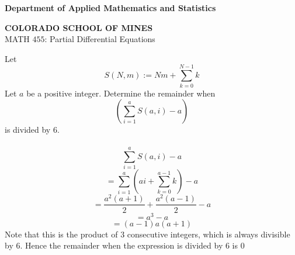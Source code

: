 \documentclass[12pt]{article}
\begin{document}
\begin{flushleft}

\textbf{Department of Applied Mathematics and Statistics}

\textbf{COLORADO SCHOOL OF MINES}\\


MATH $455$: Partial Differential Equations
\end{flushleft}

Let $$S(N,m) := Nm + \sum_{k=0}^{N-1} k$$ Let $a$ be a positive integer. Determine the remainder when $$\left( \sum_{i=1}^a S(a,i) - a \right)$$ is divided by $6$. \\ \\ 
$$\sum_{i=1}^a S(a,i) - a$$
$$ = \sum_{i=1}^a \left(ai + \sum_{k=0}^{a-1} k \right)- a$$
$$ = \frac{a^2(a+1)}{2} + \frac{a^2(a-1)}{2} - a$$
$$ = a^3 - a$$
$$ = (a-1)a(a+1)$$
Note that this is the product of $3$ consecutive integers, which is always divisible by $6$. Hence the remainder when the expression is divided by $6$ is $\boxed{0}$
\end{document}
